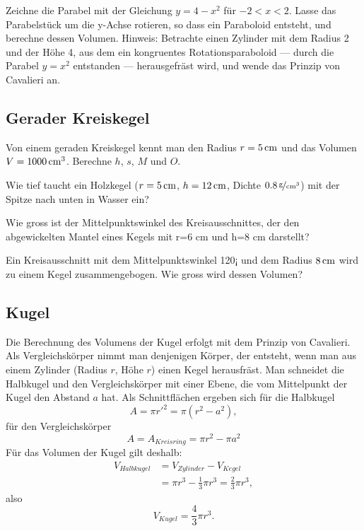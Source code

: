 \documentclass[%
11pt,%
twoside,%
titlepage,%
german,%
headsepline%
]{scrartcl}
\begin{document}
\begin{ueb}
Zeichne die Parabel mit der Gleichung $y=4-x^2$ f\"ur $-2<x<2$. Lasse das Parabelst\"uck um die y-Achse rotieren, so dass ein Paraboloid entsteht, und berechne dessen Volumen. Hinweis: Betrachte einen Zylinder mit dem Radius 2 und der H\"ohe 4, aus dem ein kongruentes Rotationsparaboloid --- durch die Parabel $y=x^2$ entstanden --- herausgefr\"ast wird, und wende das Prinzip von Cavalieri an.
\end{ueb}

\subsection{Gerader Kreiskegel}
\begin{ueb}
Von einem geraden Kreiskegel kennt man den Radius $r=\unit[5]{cm}$ und das Volumen $V=\unit[1000]{cm^3}$. Berechne $h$, $s$, $M$ und $O$.
\end{ueb}

\begin{ueb}
Wie tief taucht ein Holzkegel ($r=\unit[5]{cm}$, $h=\unit[12]{cm}$, Dichte $\unitfrac[0.8]{g}{cm^3}$) mit der Spitze nach unten in Wasser ein?
\end{ueb}

\begin{ueb}
Wie gross ist der Mittelpunktswinkel des Kreisausschnittes, der den abgewickelten Mantel eines Kegels mit r=6 cm und h=8 cm darstellt?
\end{ueb}

\begin{ueb}
Ein Kreisausschnitt mit dem Mittelpunktswinkel 120¡ und dem Radius $\unit[8]{cm}$ wird zu einem Kegel zusammengebogen. Wie gross wird dessen Volumen?
\end{ueb}

\subsection{Kugel}
Die Berechnung des Volumens der Kugel erfolgt mit dem Prinzip von Cavalieri. Als Vergleichsk\"orper nimmt man denjenigen K\"orper, der entsteht, wenn man aus einem Zylinder (Radius $r$, H\"ohe $r$) einen Kegel herausfr\"ast.
Man schneidet die Halbkugel und den Vergleichsk\"orper mit einer Ebene, die vom Mittelpunkt der Kugel den Abstand $a$ hat. Als Schnittfl\"achen ergeben sich
f\"ur die Halbkugel
$$A = \pi r'^2 =\pi(r^2 - a^2),$$
f\"ur den Vergleichsk\"orper
$$A =A_{Kreisring} =\pi r^2-\pi a^2$$
F\"ur das Volumen der Kugel gilt deshalb:
\begin{align*}
V_{Halbkugel}&=V_{Zylinder}-V_{Kegel}\\
&=\pi r^3-\frac{1}{3}\pi r^3=\frac{2}{3}\pi r^3,
\end{align*}
also
$$V_{Kugel}=\frac{4}{3}\pi r^3.$$
\end{document}
